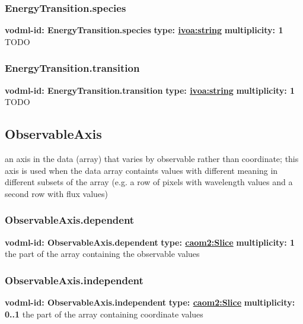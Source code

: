     \subsubsection{EnergyTransition.species}
      \textbf{vodml-id: EnergyTransition.species} \newline
      \textbf{type: \hyperref[sect:ivoa]{ivoa:string}} \newline
      \textbf{multiplicity: 1} \newline
      TODO

    \subsubsection{EnergyTransition.transition}
      \textbf{vodml-id: EnergyTransition.transition} \newline
      \textbf{type: \hyperref[sect:ivoa]{ivoa:string}} \newline
      \textbf{multiplicity: 1} \newline
      TODO

  \subsection{ObservableAxis}
  \label{sect:ObservableAxis}
    an axis in the data (array) that varies by observable rather than coordinate; this axis is used when the data array containts values with different meaning in different subsets of the array (e.g. a row of pixels with wavelength values and a second row with flux values)

    \subsubsection{ObservableAxis.dependent}
      \textbf{vodml-id: ObservableAxis.dependent} \newline
      \textbf{type: \hyperref[sect:Slice]{caom2:Slice}} \newline
      \textbf{multiplicity: 1} \newline
      the part of the array containing the observable values

    \subsubsection{ObservableAxis.independent}
      \textbf{vodml-id: ObservableAxis.independent} \newline
      \textbf{type: \hyperref[sect:Slice]{caom2:Slice}} \newline
      \textbf{multiplicity: 0..1} \newline
      the part of the array containing coordinate values

